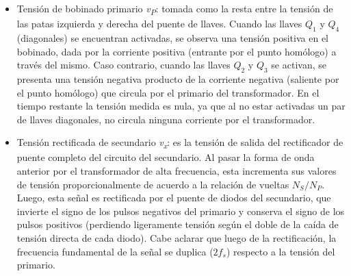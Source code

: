 \begin{itemize}
    \item {\Medium Tensión de bobinado primario \textit{v\textsubscript{P}}}: tomada como la resta entre la tensión de las patas izquierda y derecha del puente de llaves. Cuando las llaves $Q_1$ y $Q_4$ (diagonales) se encuentran activadas, se observa una tensión positiva en el bobinado, dada por la corriente positiva (entrante por el punto homólogo) a través del mismo. Caso contrario, cuando las llaves $Q_2$ y $Q_3$ se activan, se presenta una tensión negativa producto de la corriente negativa (saliente por el punto homólogo) que circula por el primario del transformador. En el tiempo restante la tensión medida es nula, ya que al no estar activadas un par de llaves diagonales, no circula ninguna corriente por el transformador.
    \item {\Medium Tensión rectificada de secundario \textit{v\textsubscript{x}}}: es la tensión de salida del rectificador de puente completo del circuito del secundario. Al pasar la forma de onda anterior por el transformador de alta frecuencia, esta incrementa sus valores de tensión proporcionalmente de acuerdo a la relación de vueltas $N_S/N_P$. Luego, esta señal es rectificada por el puente de diodos del secundario, que invierte el signo de los pulsos negativos del primario y conserva el signo de los pulsos positivos (perdiendo ligeramente tensión según el doble de la caída de tensión directa de cada diodo). Cabe aclarar que luego de la rectificación, la frecuencia fundamental de la señal se duplica ($2f_s$) respecto a la tensión del primario.
\end{itemize}

\lipsum[1]\\